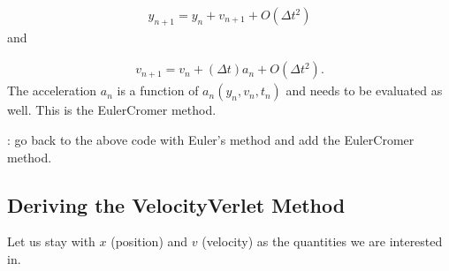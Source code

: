 \documentclass[letterpaper,10pt,english]{sphinxmanual}
\begin{document}
\begin{equation*}
\begin{split}
\begin{equation} 
y_{n+1}=y_{n}+ v_{n+1}+O(\Delta t^2)
\label{_auto14} \tag{15}
\end{equation}
\end{split}
\end{equation*}
and




\begin{equation*}
\begin{split}
\begin{equation}
v_{n+1}=v_{n}+(\Delta t) a_{n}+O(\Delta t^2).
\label{_auto15} \tag{16}
\end{equation}
\end{split}
\end{equation*}
The acceleration \(a_n\) is a function of \(a_n(y_n, v_n, t_n)\) and needs to be evaluated
as well. This is the Euler\sphinxhyphen{}Cromer method.

: go back to the above code with Euler’s method and add the Euler\sphinxhyphen{}Cromer method.


\subsection{Deriving the Velocity\sphinxhyphen{}Verlet Method}
\label{\detokenize{chapter3:deriving-the-velocity-verlet-method}}
Let us stay with \(x\) (position) and \(v\) (velocity) as the quantities we are interested in.
\end{document}

